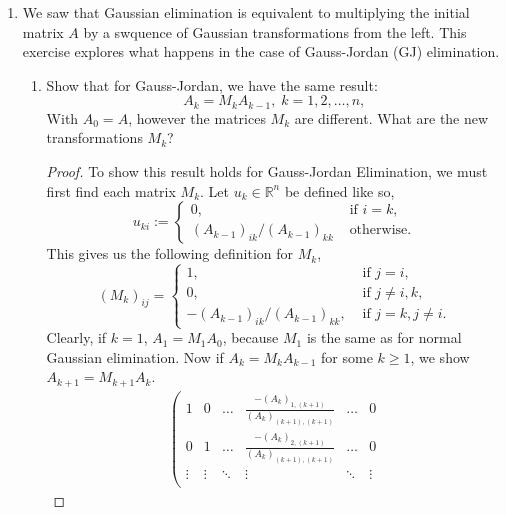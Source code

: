 \documentclass[11pt]{article}
\newcommand{\R}{\mathbb{R}}
\begin{document}
\begin{enumerate}
\begin{enumerate}
	      \end{enumerate}

	\item We saw that Gaussian elimination is equivalent to multiplying the initial matrix \(A\) by a swquence of Gaussian transformations from the left.  This exercise explores what happens in the case of Gauss-Jordan (GJ) elimination.
	      \begin{enumerate}
		      \item Show that for Gauss-Jordan, we have the same result:
		            \[A_k = M_kA_{k-1}, \; k = 1, 2, \dots, n,\]
		            With \(A_0 = A\), however the matrices \(M_k\) are different.  What are the new transformations \(M_k\)?
		            \begin{proof}
			            To show this result holds for Gauss-Jordan Elimination, we must first find each matrix \(M_k\).  Let \(u_k \in \R^n\) be defined like so,
			            \[u_{ki} := \begin{cases}
					            0,                              & \text{ if } i = k, \\
					            (A_{k-1})_{ik} / (A_{k-1})_{kk} & \text{ otherwise}.
				            \end{cases}\]
			            This gives us the following definition for \(M_k\),
			            \[(M_k)_{ij} = \begin{cases}
					            1,                                & \text{ if } j = i,           \\
					            0,                                & \text{ if } j \neq i,k,      \\
					            -(A_{k-1})_{ik} / (A_{k-1})_{kk}, & \text{ if } j = k, j \neq i.
				            \end{cases}\]
			            Clearly, if \(k=1\), \(A_1 = M_1A_0\), because \(M_1\) is the same as for normal Gaussian elimination.  Now if \(A_k = M_kA_{k-1}\) for some \(k \geq 1\), we show \(A_{k+1} = M_{k+1}A_k\).
			            \footnotesize\begin{align*}
				            \left(\begin{array}{cccccc}
						                  1      & 0      & \hdots & \frac{-(A_k)_{1,(k+1)}}{(A_k)_{(k+1),(k+1)}}     & \hdots & 0      \\
						                  0      & 1      & \hdots & \frac{-(A_k)_{2,(k+1)}}{(A_k)_{(k+1),(k+1)}}     & \hdots & 0      \\
						                  \vdots & \vdots & \ddots & \vdots                                           & \ddots & \vdots \\

\end{array}
\end{align*}
\end{proof}
\end{enumerate}
\end{enumerate}
\end{document}
